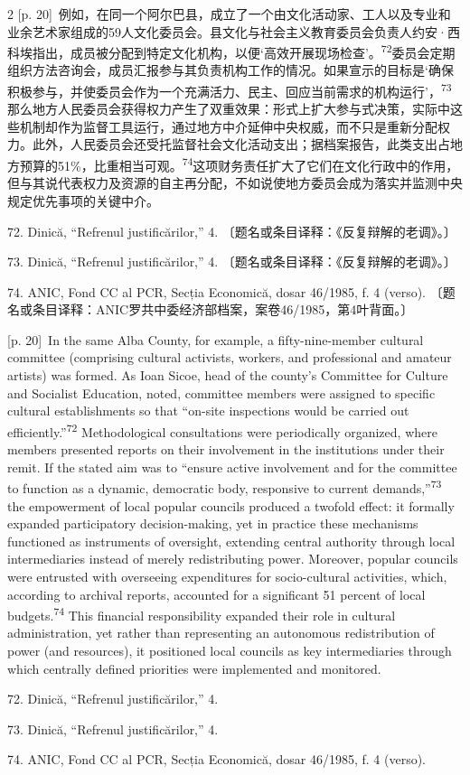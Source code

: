 \documentclass[10pt,a4paper]{article}
\begin{document}
\begin{paracol}{2}
{\scriptsize\color{gray} [p. 20]}\ 例如，在同一个阿尔巴县，成立了一个由文化活动家、工人以及专业和业余艺术家组成的59人文化委员会。县文化与社会主义教育委员会负责人约安·西科埃指出，成员被分配到特定文化机构，以便‘高效开展现场检查’。\nobreak\textsuperscript{72}委员会定期组织方法咨询会，成员汇报参与其负责机构工作的情况。如果宣示的目标是‘确保积极参与，并使委员会作为一个充满活力、民主、回应当前需求的机构运行’，\nobreak\textsuperscript{73}那么地方人民委员会获得权力产生了双重效果：形式上扩大参与式决策，实际中这些机制却作为监督工具运行，通过地方中介延伸中央权威，而不只是重新分配权力。此外，人民委员会还受托监督社会文化活动支出；据档案报告，此类支出占地方预算的51\%，比重相当可\mbox{观。\textsuperscript{74}}这项财务责任扩大了它们在文化行政中的作用，但与其说代表权力及资源的自主再分配，不如说使地方委员会成为落实并监测中央规定优先事项的关键中介。\par{\small 72. Dinică, “Refrenul justificărilor,” 4. 〔题名或条目译释：《反复辩解的老调》。〕\par}{\small 73. Dinică, “Refrenul justificărilor,” 4. 〔题名或条目译释：《反复辩解的老调》。〕\par}{\small 74. ANIC, Fond CC al PCR, Secția Economică, dosar 46/1985, f. 4 (verso). 〔题名或条目译释：ANIC罗共中委经济部档案，案卷46/1985，第4叶背面。〕\par}
\switchcolumn
{\scriptsize\color{gray} [p. 20]}\ In the same Alba County, for example, a fifty-nine-member cultural committee (comprising cultural activists, workers, and professional and amateur artists) was formed. As Ioan Sicoe, head of the county’s Committee for Culture and Socialist Education, noted, committee members were assigned to specific cultural establishments so that “on-site inspections would be carried out efficiently.”\nobreak\textsuperscript{72} Methodological consultations were periodically organized, where members presented reports on their involvement in the institutions under their remit. If the stated aim was to “ensure active involvement and for the committee to function as a dynamic, democratic body, responsive to current demands,”\nobreak\textsuperscript{73} the empowerment of local popular councils produced a twofold effect: it formally expanded participatory decision-making, yet in practice these mechanisms functioned as instruments of oversight, extending central authority through local intermediaries instead of merely redistributing power. Moreover, popular councils were entrusted with overseeing expenditures for socio-cultural activities, which, according to archival reports, accounted for a significant 51 percent of local budgets.\nobreak\textsuperscript{74} This financial responsibility expanded their role in cultural administration, yet rather than representing an autonomous redistribution of power (and resources), it positioned local councils as key intermediaries through which centrally defined priorities were implemented and monitored.\par{\small 72. Dinică, “Refrenul justificărilor,” 4.\par}{\small 73. Dinică, “Refrenul justificărilor,” 4.\par}{\small 74. ANIC, Fond CC al PCR, Secția Economică, dosar 46/1985, f. 4 (verso).\par}

\end{paracol}
\end{document}
